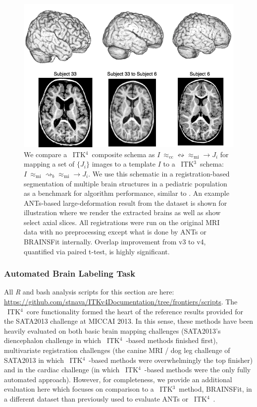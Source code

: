 \documentclass{frontiersSCNS}
\newcommand{\tk}{~ITK$^{\text{4}}$~}
\newcommand{\tkt}{~ITK$^{\text{3}}$~}
\begin{document}
\begin{figure}[t]
\begin{center}
\includegraphics[width=5.5in]{figs/figEval.png}
\caption{We compare a \tk composite schema as $I
~\approx_\text{cc}  \leftrightsquigarrow \approx_\text{mi}  \rightarrow
J_i $ for mapping a set of $\{ J_i \}$ images
to a template $I$ to a \tkt schema:  $I
~\approx_\text{mi} \rightsquigarrow_b    \approx_\text{mi}  \rightarrow
J_i $.  We use this schematic in a registration-based
segmentation of multiple brain structures in a pediatric population as a benchmark
for algorithm performance, similar to \cite{Klein2010}.  An example ANTs-based
large-deformation result from the dataset is shown for illustration
where we render the extracted brains as well as show select axial
slices.  All registrations were run on the original MRI data with no
preprocessing except what is done by ANTs or BRAINSFit internally. Overlap improvement from v3 to v4, quantified via
paired t-test, is highly significant.}
\label{fig:eval}
\end{center}
\end{figure}

\subsubsection{Automated Brain Labeling Task}
All \textit{R} and bash analysis scripts for this section are here:
\href{https://github.com/stnava/ITKv4Documentation/tree/frontiers/scripts}{https://github.com/stnava/ITKv4Documentation/tree/frontiers/scripts}.
The \tk core functionality formed the heart of the reference results
provided for the SATA2013 challenge at MICCAI 2013.  In this sense,
these methods have been heavily evaluated on both basic brain mapping
challenges (SATA2013's diencephalon challenge in which \tk-based
methods finished first), multivariate
registration challenges (the canine MRI / dog leg challenge of
SATA2013 in which \tk-based methods were overwhelmingly the top
finisher) and in the cardiac challenge (in which \tk-based methods
were the only fully automated approach).  However, for completeness,
we provide an additional evaluation here which focuses on comparison
to a \tkt method, BRAINSFit, in a different dataset than previously
used to evaluate ANTs or \tk.
\end{document}
